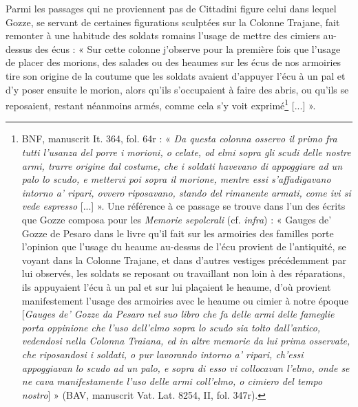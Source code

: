\documentclass[12pt,twoside,openany]{book}
\begin{document}
Parmi les passages qui ne proviennent pas de Cittadini figure celui dans lequel Gozze, se servant de certaines figurations sculptées sur la Colonne Trajane, fait remonter à une habitude des soldats romains l’usage de mettre des cimiers au-dessus des écus : « Sur cette colonne j’observe pour la première fois que l’usage de placer des morions, des salades ou des heaumes sur les écus de nos armoiries tire son origine de la coutume que les soldats avaient d’appuyer l’écu à un pal et d’y poser ensuite le morion, alors qu’ils s’occupaient à faire des abris, ou qu’ils se reposaient, restant néanmoins armés, comme cela s’y voit exprimé\footnote{BNF, manuscrit It. 364, fol. 64r : « \textit{Da questa colonna osservo il primo fra tutti l'usanza del porre i morioni, o celate, od elmi sopra gli scudi delle nostre armi, trarre origine dal costume, che i soldati havevano di appoggiare ad un palo lo scudo, e mettervi poi sopra il morione, mentre essi s'affadigavano intorno a' ripari, ovvero riposavano, stando del rimanente armati, come ivi si vede espresso }[...] ». Une référence à ce passage se trouve dans l’un des écrits que Gozze composa pour les \textit{Memorie sepolcrali }(cf. \textit{infra}) : « Gauges de’ Gozze de Pesaro dans le livre qu’il fait sur les armoiries des familles porte l’opinion que l’usage du heaume au-dessus de l’écu provient de l’antiquité, se voyant dans la Colonne Trajane, et dans d’autres vestiges précédemment par lui observés, les soldats se reposant ou travaillant non loin à des réparations, ils appuyaient l’écu à un pal et sur lui plaçaient le heaume, d’où provient manifestement l’usage des armoiries avec le heaume ou cimier à notre époque [\textit{Gauges de’ Gozze da Pesaro nel suo libro che fa delle armi delle fameglie porta oppinione che l’uso dell’elmo sopra lo scudo sia tolto dall’antico, vedendosi nella Colonna Traiana, ed in altre memorie da lui prima osservate, che riposandosi i soldati, o pur lavorando intorno a’ ripari, ch’essi appoggiavan lo scudo ad un palo, e sopra di esso vi collocavan l’elmo, onde se ne cava manifestamente l’uso delle armi coll’elmo, o cimiero del tempo nostro}] » (BAV, manuscrit Vat. Lat. 8254, II, fol. 347r).} [...] ».
\end{document}
